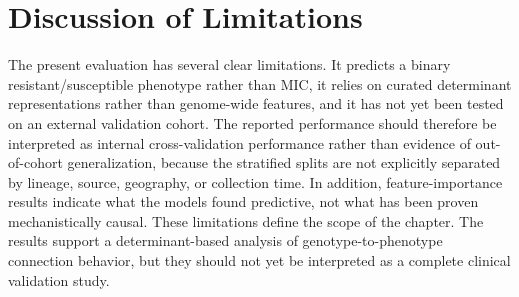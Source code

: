 \section{Discussion of Limitations}

The present evaluation has several clear limitations. It predicts a binary resistant/susceptible phenotype rather than MIC, it relies on curated determinant representations rather than genome-wide features, and it has not yet been tested on an external validation cohort. The reported performance should therefore be interpreted as internal cross-validation performance rather than evidence of out-of-cohort generalization, because the stratified splits are not explicitly separated by lineage, source, geography, or collection time. In addition, feature-importance results indicate what the models found predictive, not what has been proven mechanistically causal. These limitations define the scope of the chapter. The results support a determinant-based analysis of genotype-to-phenotype connection behavior, but they should not yet be interpreted as a complete clinical validation study.
